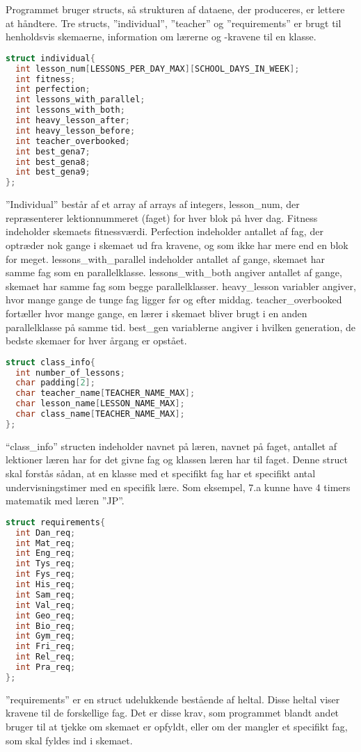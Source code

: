Programmet bruger structs, så strukturen af dataene, der produceres, er lettere at håndtere. Tre structs, ”individual”, ”teacher” og ”requirements” er brugt til henholdsvis skemaerne, information om lærerne og -kravene til en klasse.

\begin{lstlisting}[language = C]
struct individual{
  int lesson_num[LESSONS_PER_DAY_MAX][SCHOOL_DAYS_IN_WEEK];
  int fitness;
  int perfection;
  int lessons_with_parallel;
  int lessons_with_both;
  int heavy_lesson_after;
  int heavy_lesson_before;
  int teacher_overbooked;
  int best_gena7;
  int best_gena8;
  int best_gena9; 
};
\end{lstlisting}

”Individual” består af et array af arrays af integers, lesson\_num, der repræsenterer lektionnummeret (faget) for hver blok på hver dag. Fitness indeholder skemaets fitnessværdi. Perfection indeholder antallet af fag, der optræder nok gange i skemaet ud fra kravene, og som ikke har mere end en blok for meget. lessons\_with\_parallel indeholder antallet af gange, skemaet har samme fag som en parallelklasse. lessons\_with\_both angiver antallet af gange, skemaet har samme fag som begge parallelklasser. heavy\_lesson variabler angiver, hvor mange gange de tunge fag ligger før og efter middag. teacher\_overbooked fortæller hvor mange gange, en lærer i skemaet bliver brugt i en anden parallelklasse på samme tid. best\_gen variablerne angiver i hvilken generation, de bedste skemaer for hver årgang er opstået.

\begin{lstlisting}[language = C]
struct class_info{
  int number_of_lessons;
  char padding[2];
  char teacher_name[TEACHER_NAME_MAX];
  char lesson_name[LESSON_NAME_MAX];
  char class_name[TEACHER_NAME_MAX];  
};
\end{lstlisting}

“class_info” structen indeholder navnet på læren, navnet på faget, antallet af lektioner læren har for det givne fag og klassen læren har til faget. Denne struct skal forstås sådan, at en klasse med et specifikt fag har et specifikt antal undervisningstimer med en specifik lære. Som eksempel, 7.a kunne have 4 timers matematik med læren ”JP”. 

\begin{lstlisting}[language = C]
struct requirements{
  int Dan_req;
  int Mat_req;
  int Eng_req;
  int Tys_req;
  int Fys_req;
  int His_req;
  int Sam_req;
  int Val_req;
  int Geo_req;
  int Bio_req;
  int Gym_req;
  int Fri_req;
  int Rel_req;
  int Pra_req;
};
\end{lstlisting}

”requirements” er en struct udelukkende bestående af heltal. Disse heltal viser kravene til de forskellige fag. Det er disse krav, som programmet blandt andet bruger til at tjekke om skemaet er opfyldt, eller om der mangler et specifikt fag, som skal fyldes ind i skemaet.
\newpage